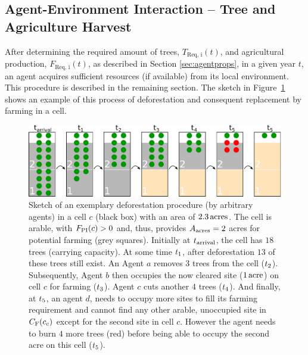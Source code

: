 \subsection{Agent-Environment Interaction -- Tree and Agriculture Harvest} \label{sec:Harvest}
After determining the required amount of trees, $T_\text{Req, i}(t)$, and agricultural production, $F_\text{Req, i}(t)$, as described in Section \ref{sec:agentprops}, in a given year $t$, an agent acquires sufficient resources (if available) from its local environment.
This procedure is described in the remaining section. 
The sketch in Figure~\ref{fig:treeburning} shows an example of this process of deforestation and consequent replacement by farming in a cell.
\begin{figure}
	\centering
	\includegraphics[width=\textwidth]{images/SketchABM2/burningSketch.pdf}
	\caption{Sketch of an exemplary deforestation procedure (by arbitrary agents) in a cell $c$ (black box) with an area of $2.3\, \rm{acres}$.
		The cell is arable, with $F_{\rm PI}(c)>0$ and, thus, provides $A_{\rm acres}=2$ acres for potential farming (grey squares).
		Initially at $t_{\rm arrival}$, the cell has $18$ trees (carrying capacity).
		At some time $t_{\rm 1}$, after deforestation $13$ of these trees still exist. 
		An Agent $a$ removes $3$ trees from the cell (\ra $t_{\rm 2}$). 
		Subsequently, Agent $b$ then occupies the now cleared site ($1\, {\rm acre}$) on cell $c$ for farming (\ra $t_{\rm 3}$). 
		Agent $c$ cuts another $4$ trees (\ra $t_{\rm 4}$).
		And finally, at $t_{\rm 5}$, an agent $d$, needs to occupy more sites to fill its farming requirement and cannot find any other arable, unoccupied site in $C_{\rm F}(c_c)$ except for the second site in cell $c$. 
		However the agent needs to burn $4$ more trees (red) before being able to occupy the second acre on this cell (\ra $t_{\rm 5}$).}
	\label{fig:treeburning}
\end{figure}


